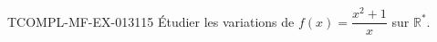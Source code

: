 \begin{exercice}{TCOMPL-MF-EX-013}{1}{15}
Étudier les variations de $f(x) = \dfrac{x^2+1}{x}$ sur $\mathbb{R}^*$.

\end{exercice}
